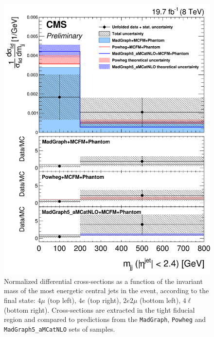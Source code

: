 \begin{figure}[hbtp]
\begin{center}
    \includegraphics[width=\cmsFigWidth]{Figures/DiffCrossSecZZTo4lCentralMjj_Unfolded_fr_MadGraph_norm.png}       
    \caption{\footnotesize{Normalized differential cross-sections as a function of the invariant mass of the most energetic central jets in the event, according to the final state: $4\mu$ (top left), $4e$ (top right), $2e2\mu$  (bottom left),  $4\ell$ (bottom right). Cross-sections are extracted in the tight fiducial region and compared to predictions from the \texttt{MadGraph}, \texttt{Powheg} and \texttt{MadGraph5\_aMCatNLO} sets of samples.}}
    \label{fig:diff_xs_centralmjj}
  \end{center}
\end{figure}

